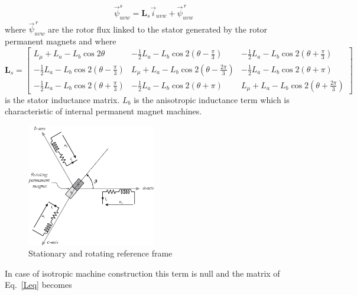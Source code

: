 \documentclass[11pt,a4paper]{article}
\numberwithin{equation}{section}
\theoremstyle{it}
\theoremstyle{definition}
\begin{document}
\begin{onehalfspace}
\begin{equation}\label{threephase_eq2}
	\begin{aligned}
		\vec{\psi}^s_{uvw} = \mathbf{L}_s\vec{i}_{uvw}+\vec{\psi}^{\,r}_{uvw}
	\end{aligned}
\end{equation}
where $\vec{\psi}^{\,r}_{uvw}$ are the rotor flux linked to the stator generated by the rotor permanent magnets and where
\begin{equation}\label{Leq}
	\mathbf{L}_s = 
	\begin{bmatrix} 
		L_{\mu}+L_a-L_b\cos2\theta & -\frac{1}{2}L_a-L_b\cos2(\theta-\frac{\pi}{3}) & -\frac{1}{2}L_a-L_b\cos2(\theta+\frac{\pi}{3}) \\[6pt]
		-\frac{1}{2}L_a-L_b\cos2(\theta-\frac{\pi}{3}) & L_{\mu}+L_a-L_b\cos2(\theta-\frac{2\pi}{3}) & -\frac{1}{2}L_a-L_b\cos2(\theta+\pi) \\[6pt]
		-\frac{1}{2}L_a-L_b\cos2(\theta+\frac{\pi}{3}) & -\frac{1}{2}L_a-L_b\cos2(\theta+\pi) & L_{\mu}+L_a-L_b\cos2(\theta+\frac{2\pi}{3})
	\end{bmatrix}
\end{equation}
is the stator inductance matrix. $L_b$ is the anisotropic inductance term which is characteristic of internal permanent magnet machines. 
\begin{figure}[H]
	\centering
	\includegraphics[width = 0.5\textwidth, width = 240pt, keepaspectratio]{figures/pmsm/electrical_three_phases.eps}
	\captionsetup{width=0.5\textwidth, font=small} 
	\caption	{Stationary and rotating reference frame}
	\label{electrical_three_phase}
\end{figure}
In case of isotropic machine construction this term is null and the matrix of Eq.~\eqref{Leq} becomes
\begin{equation}

\end{equation}
\end{onehalfspace}
\end{document}
